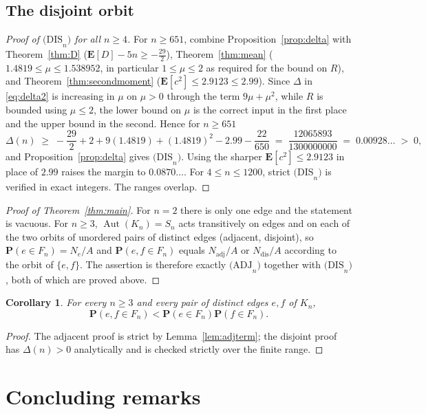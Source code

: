 \documentclass[11pt,a4paper]{amsart}
\theoremstyle{plain}
\newtheorem{corollary}[theorem]{Corollary}
\theoremstyle{definition}
\newcommand{\PR}{\mathbf{P}}
\newcommand{\EX}{\mathbf{E}}
\newcommand{\Nc}{N}
\newcommand{\ADJ}{\mathrm{(ADJ}_n\mathrm{)}}
\newcommand{\DIS}{\mathrm{(DIS}_n\mathrm{)}}
\begin{document}
\subsection{The disjoint orbit}

\begin{proof}[Proof of $\DIS$ for all $n \ge 4$]
For $n \ge 651$, combine Proposition~\ref{prop:delta} with
Theorem~\ref{thm:D} ($\EX[D]-5n \ge -\tfrac{29}{2}$),
Theorem~\ref{thm:mean} ($1.4819 \le \mu \le 1.538952$, in particular
$1 \le \mu \le 2$ as required for the bound on $R$),
and Theorem~\ref{thm:secondmoment} ($\EX[c^2]\le 2.9123 \le 2.99$). Since
$\Delta$ in \eqref{eq:delta2} is increasing in $\mu$ on $\mu>0$ through the term
$9\mu+\mu^2$, while $R$ is bounded using $\mu \le 2$, the lower bound on $\mu$ is
the correct input in the first place and the upper bound in the second. Hence for
$n \ge 651$
\[
  \Delta(n) \;\ge\; -\frac{29}{2}+2+9(1.4819)+(1.4819)^2-2.99-\frac{22}{650}
   \;=\; \frac{12065893}{1300000000} \;=\;0.00928\ldots\;>\;0 ,
\]
and Proposition~\ref{prop:delta} gives $\DIS$. Using the sharper
$\EX[c^2]\le 2.9123$ in place of $2.99$ raises the margin to $0.0870\ldots$. For
$4 \le n \le 1200$, strict $\DIS$ is verified in exact integers. The ranges overlap.
\end{proof}

\begin{proof}[Proof of Theorem~\ref{thm:main}]
For $n=2$ there is only one edge and the statement is vacuous. For $n \ge 3$,
$\operatorname{Aut}(K_n) = S_n$ acts transitively on edges and on each of the two
orbits of unordered pairs of distinct edges (adjacent, disjoint), so
$\PR(e\in F_n)=\Nc_e/A$ and $\PR(e,f\in F_n)$ equals $\Nc_{\mathrm{adj}}/A$ or
$\Nc_{\mathrm{dis}}/A$ according to the orbit of $\{e,f\}$. The assertion is
therefore exactly $\ADJ$ together with $\DIS$, both of which are proved above.
\end{proof}

\begin{corollary}\label{cor:strict}
For every $n\ge3$ and every pair of distinct edges $e,f$ of $K_n$,
\[
  \PR(e,f\in F_n)<\PR(e\in F_n)\PR(f\in F_n).
\]
\end{corollary}

\begin{proof}
The adjacent proof is strict by Lemma~\ref{lem:adjterm}; the disjoint proof has
$\Delta(n)>0$ analytically and is checked strictly over the finite range.
\end{proof}

\section{Concluding remarks}\label{sec:remarks}
\end{document}
